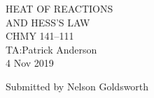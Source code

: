 \documentclass{article}
\numberwithin{equation}{section}
\begin{document}
\begin{center}
HEAT OF REACTIONS\\
AND HESS'S LAW\\
CHMY 141--111\\
TA:\@ Patrick Anderson\\
4 Nov 2019
\end{center}
\newpage

\newcommand{\hcl}{\ch{HCl}\space}
\newcommand{\koh}{\ch{KOH}\space}







\newpage
\printbibliography
\vfill


Submitted by Nelson Goldsworth
\end{document}
